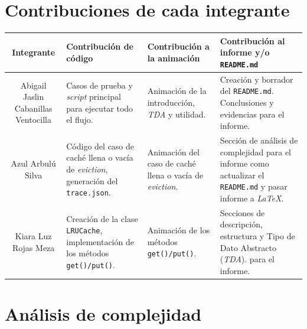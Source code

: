 \documentclass[a4paper, table]{article}
\begin{document}
\section{Contribuciones de cada integrante}

    \begin{table}[H]
        \centering        
        \begin{tabular}{|c|p{3.5cm}|p{3.5cm}|p{3.5cm}|}
            \hline \textbf{Integrante} & \textbf{Contribución de código} & \textbf{Contribución a la animación} & \textbf{Contribución al informe y/o \texttt{README.md}} \\
            \hline Abigail Jaslin Cabanillas Ventocilla & 
            Casos de prueba y \textit{script} principal para ejecutar todo el flujo. & 
            Animación de la introducción, \textit{TDA} y utilidad. 
            & 
            Creación y borrador del \texttt{README.md}. Conclusiones y evidencias para el informe. \\
            \hline Azul Arbulú Silva &
            Código del caso de caché llena o vacía de \textit{eviction}, generación del \texttt{trace.json}. & 
            Animación del caso de caché llena o vacía de \textit{eviction}. & 
            Sección de análisis de complejidad para el informe como actualizar el \texttt{README.md} y pasar informe a \textit{LaTeX}. \\ 
            \hline Kiara Luz Rojas Meza & 
            Creación de la clase \texttt{LRUCache}, implementación de los métodos \texttt{get()/put()}. &
            Animación de los métodos \texttt{get()/put()}. & 
            Secciones de descripción, estructura y Tipo de Dato Abstracto (\textit{TDA}). para el informe. \\ \hline
        \end{tabular}    
    \end{table}

\section{Análisis de complejidad}
\end{document}
